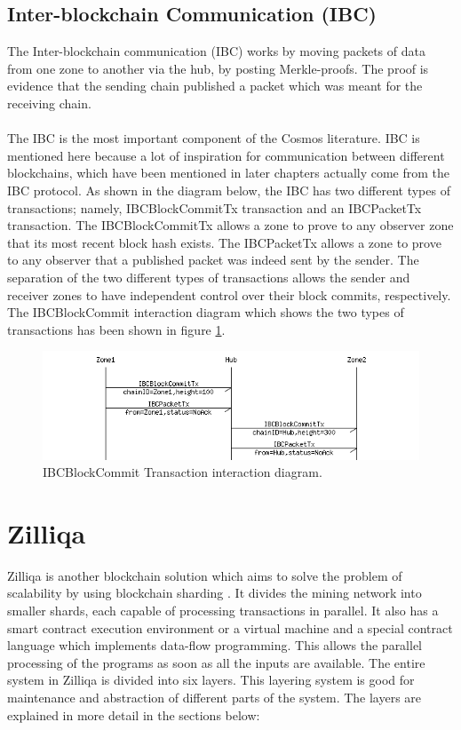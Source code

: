 \documentclass[a4paper,twoside,phd]{BYUPhys}
\begin{document}
\subsection{Inter-blockchain Communication (IBC)}
The Inter-blockchain communication (IBC) works by moving packets of data from one zone to another via the hub, by posting Merkle-proofs\cite{Kwon2018ALedgers}. The proof is evidence that the sending chain published a packet which was meant for the receiving chain\cite{Kwon2018ALedgers}. 
\\
\\
The IBC is the most important component of the Cosmos literature. IBC is mentioned here because a lot of inspiration for communication between different blockchains, which have been mentioned in later chapters actually come from the IBC protocol. As shown in the diagram below, the IBC has two different types of transactions; namely, IBCBlockCommitTx transaction and an IBCPacketTx transaction\cite{Kwon2018ALedgers}. The IBCBlockCommitTx allows a zone to prove to any observer zone that its most recent block hash exists\cite{Kwon2018ALedgers}. The IBCPacketTx allows a zone to prove to any observer that a published packet was indeed sent by the sender\cite{Kwon2018ALedgers}. The separation of the two different types of transactions allows the sender and receiver zones to have independent control over their block commits, respectively. The IBCBlockCommit interaction diagram which shows the two types of transactions has been shown in figure \ref{fig:1}.
\begin{figure}
  \includegraphics[width=\linewidth]{ibc_transactions.png}
  \caption{IBCBlockCommit Transaction interaction diagram\cite{Kwon2018ALedgers}.}
  \label{fig:1}
\end{figure}

\section{Zilliqa}
Zilliqa is another blockchain solution which aims to solve the problem of scalability by using blockchain sharding \cite{TheZilliqaTeam2017TheWhitepaper}. It divides the mining network into smaller shards, each capable of processing transactions in parallel\cite{TheZilliqaTeam2017TheWhitepaper}. It also has a smart contract execution environment or a virtual machine and a special contract language which implements data-flow programming\cite{TheZilliqaTeam2017TheWhitepaper}. This allows the parallel processing of the programs as soon as all the inputs are available. The entire system in Zilliqa is divided into six layers\cite{TheZilliqaTeam2017TheWhitepaper}. This layering system is good for maintenance and abstraction of different parts of the system. The layers are explained in more detail in the sections below\cite{TheZilliqaTeam2017TheWhitepaper}:
\end{document}
